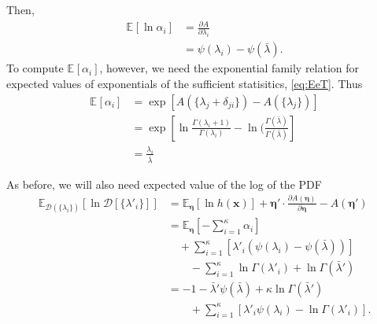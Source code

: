 \documentclass[aps,showpacs,twocolumn,prd,superscriptaddress,nofootinbib]{revtex4}
\newcommand{\nn}{\nonumber}
\newcommand{\E}[1]{{\mathbb E}_{#1}\!}
\begin{document}
Then, 
\begin{align}
\E{}\left[\ln\alpha_i\right] 
&=\frac{\partial A}{\partial\lambda_{i}}\nn\\
&=\psi(\lambda_i)-\psi(\bar\lambda).\label{eq:Elnalpha}
\end{align}
To compute $\E{}\left[\alpha_i\right]$, however, we need the exponential family relation for expected values of exponentials of the sufficient statisitics, \eqref{eq:EeT}. Thus
\begin{align*}
  \E{}\left[\alpha_i\right]
  &=\exp\left[A(\{\lambda_j+\delta_{ji}\})-A(\{\lambda_j\})\right]\\
  &=\exp\left[\ln\frac{\Gamma(\lambda_i+1)}{\Gamma(\lambda_i)}-\ln(\frac{\Gamma(\bar\lambda)}{\Gamma(\bar\lambda)}\right]\\
  &=\frac{\lambda_i}{\bar\lambda}
\end{align*}

As before, we will also need expected value of the log of the PDF
\begin{align}
    \E{\mathcal{D}(\{\lambda_i\})}\left[\ln{\mathcal{D}[\{\lambda'_i\}]}\right]
    &=\E{\bm\eta}\left[\ln{h(\bm x)}\right]+\bm\eta' \cdot \frac{\partial A(\bm\eta)}{\partial\bm\eta} -A({\bm\eta'})\nn\\
    &=\E{\bm\eta}\left[-\sum_{i=1}^\kappa\alpha_i\right]\nn\\
    &\quad+\sum_{i=1}^\kappa\left[\lambda'_i(\psi(\lambda_i)-\psi(\bar\lambda))\right]\nn\\
    &\qquad-\sum_{i=1}^\kappa\ln\Gamma(\lambda'_i)+\ln\Gamma(\bar\lambda')\nn\\
    &=-1-\bar\lambda'\psi(\bar\lambda)+\kappa\ln\Gamma(\bar\lambda')\nn\\
    &\qquad+\sum_{i=1}^\kappa\left[\lambda'_i\psi(\lambda_i)-\ln\Gamma(\lambda'_i)\right].
    \label{eq:ElnD}
\end{align}
\end{document}

